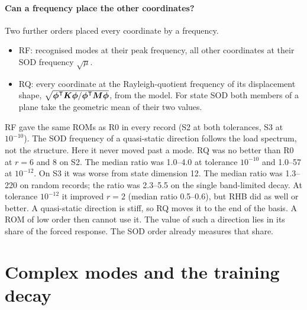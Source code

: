\documentclass[11pt]{article}
\begin{document}
\paragraph{Can a frequency place the other coordinates?} Two further orders placed every coordinate by a frequency.
\begin{itemize}
\item RF: recognised modes at their peak frequency, all other coordinates at their SOD frequency $\sqrt{\mu}$.
\item RQ: every coordinate at the Rayleigh-quotient frequency of its displacement shape, $\sqrt{\bm{\phi}^{\mathsf T}\bm{K}\bm{\phi}/\bm{\phi}^{\mathsf T}\bm{M}\bm{\phi}}$, from the model. For state SOD both members of a plane take the geometric mean of their two values.
\end{itemize}
RF gave the same ROMs as R0 in every record (S2 at both tolerances, S3 at $10^{-10}$). The SOD frequency of a quasi-static direction follows the load spectrum, not the structure. Here it never moved past a mode.
RQ was no better than R0 at $r=6$ and 8 on S2. The median ratio was 1.0--4.0 at tolerance $10^{-10}$ and 1.0--57 at $10^{-12}$. On S3 it was worse from state dimension 12. The median ratio was 1.3--220 on random records; the ratio was 2.3--5.5 on the single band-limited decay.
At tolerance $10^{-12}$ it improved $r=2$ (median ratio 0.5--0.6), but RHB did as well or better. A quasi-static direction is stiff, so RQ moves it to the end of the basis. A ROM of low order then cannot use it.
The value of such a direction lies in its share of the forced response. The SOD order already measures that share.
\section{Complex modes and the training decay}\label{sec:s-complex}
\end{document}
